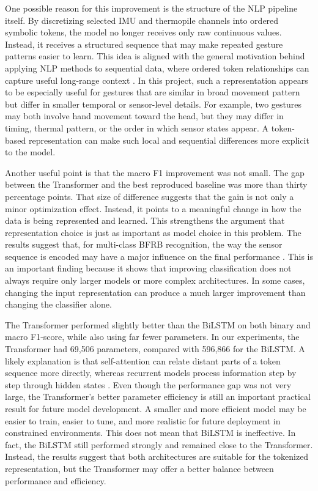 \documentclass[conference]{IEEEtran}
\begin{document}
One possible reason for this improvement is the structure of the NLP pipeline itself. By discretizing selected IMU and thermopile channels into ordered symbolic tokens, the model no longer receives only raw continuous values. Instead, it receives a structured sequence that may make repeated gesture patterns easier to learn. This idea is aligned with the general motivation behind applying NLP methods to sequential data, where ordered token relationships can capture useful long-range context \cite{vaswani2017attention, hochreiter1997lstm}. In this project, such a representation appears to be especially useful for gestures that are similar in broad movement pattern but differ in smaller temporal or sensor-level details. For example, two gestures may both involve hand movement toward the head, but they may differ in timing, thermal pattern, or the order in which sensor states appear. A token-based representation can make such local and sequential differences more explicit to the model.

Another useful point is that the macro F1 improvement was not small. The gap between the Transformer and the best reproduced baseline was more than thirty percentage points. That size of difference suggests that the gain is not only a minor optimization effect. Instead, it points to a meaningful change in how the data is being represented and learned. This strengthens the argument that representation choice is just as important as model choice in this problem. The results suggest that, for multi-class BFRB recognition, the way the sensor sequence is encoded may have a major influence on the final performance \cite{zhang2025detection}. This is an important finding because it shows that improving classification does not always require only larger models or more complex architectures. In some cases, changing the input representation can produce a much larger improvement than changing the classifier alone.

The Transformer performed slightly better than the BiLSTM on both binary and macro F1-score, while also using far fewer parameters. In our experiments, the Transformer had 69,506 parameters, compared with 596,866 for the BiLSTM. A likely explanation is that self-attention can relate distant parts of a token sequence more directly, whereas recurrent models process information step by step through hidden states \cite{vaswani2017attention, hochreiter1997lstm}. Even though the performance gap was not very large, the Transformer's better parameter efficiency is still an important practical result for future model development. A smaller and more efficient model may be easier to train, easier to tune, and more realistic for future deployment in constrained environments. This does not mean that BiLSTM is ineffective. In fact, the BiLSTM still performed strongly and remained close to the Transformer. Instead, the results suggest that both architectures are suitable for the tokenized representation, but the Transformer may offer a better balance between performance and efficiency.
\end{document}
